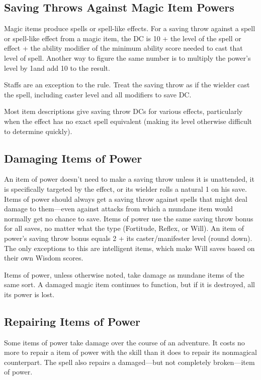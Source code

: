 \subsection{Saving Throws Against Magic Item Powers}
Magic items produce spells or spell-like effects. For a saving throw against a spell or spell-like effect from a magic item, the DC is 10 + the level of the spell or effect + the ability modifier of the minimum ability score needed to cast that level of spell. Another way to figure the same number is to multiply the power's level by 1\onehalf and add 10 to the result.

Staffs are an exception to the rule. Treat the saving throw as if the wielder cast the spell, including caster level and all modifiers to save DC.

Most item descriptions give saving throw DCs for various effects, particularly when the effect has no exact spell equivalent (making its level otherwise difficult to determine quickly).

\subsection{Damaging Items of Power}
An item of power doesn't need to make a saving throw unless it is unattended, it is specifically targeted by the effect, or its wielder rolls a natural 1 on his save. Items of power should always get a saving throw against spells that might deal damage to them---even against attacks from which a mundane item would normally get no chance to save. Items of power use the same saving throw bonus for all saves, no matter what the type (Fortitude, Reflex, or Will). An item of power's saving throw bonus equals 2 + \onehalf its caster/manifester level (round down). The only exceptions to this are intelligent items, which make Will saves based on their own Wisdom scores.

Items of power, unless otherwise noted, take damage as mundane items of the same sort. A damaged magic item continues to function, but if it is destroyed, all its power is lost.

\subsection{Repairing Items of Power}
Some items of power take damage over the course of an adventure. It costs no more to repair a item of power with the  skill than it does to repair its nonmagical counterpart. The  spell also repairs a damaged---but not completely broken---item of power.

